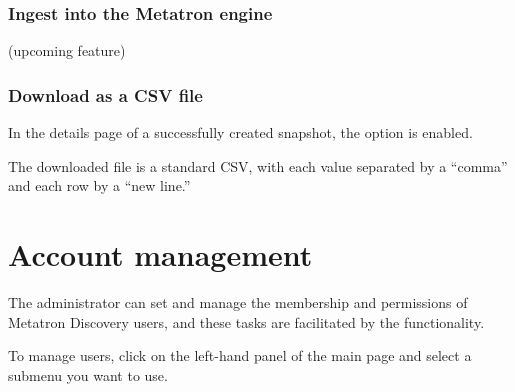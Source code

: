 \documentclass[letterpaper,10pt,english]{sphinxmanual}
\begin{document}
\subsection{Ingest into the Metatron engine}
\label{\detokenize{discovery/part07/data_snapshot:metatron}}\label{\detokenize{discovery/part07/data_snapshot:snapshot-into-druid}}
(upcoming feature)


\subsection{Download as a CSV file}
\label{\detokenize{discovery/part07/data_snapshot:csv}}\label{\detokenize{discovery/part07/data_snapshot:snapshot-into-csv}}
In the details page of a successfully created snapshot, the  option is enabled.
\begin{quote}

\begin{figure}[H]
\centering

\noindent{}
\end{figure}
\end{quote}

The downloaded file is a standard CSV, with each value separated by a “comma” and each row by a “new line.”
\begin{quote}

\begin{figure}[H]
\centering

\noindent{}
\end{figure}
\end{quote}


\chapter{Account management}
\label{\detokenize{discovery/part08/index:id1}}\label{\detokenize{discovery/part08/index::doc}}
The administrator can set and manage the membership and permissions of Metatron Discovery users, and these tasks are facilitated by the  functionality.

To manage users, click  on the left-hand panel of the main page and select a submenu you want to use.
\begin{quote}

\begin{figure}[H]
\centering

\noindent{}
\end{figure}
\end{quote}
\end{document}

